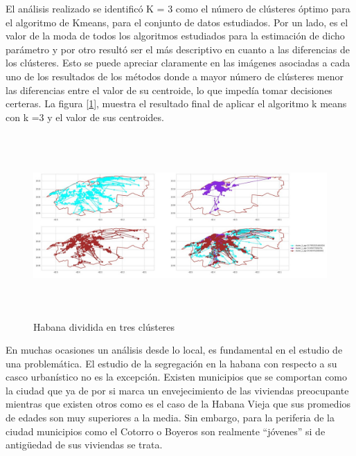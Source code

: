 El análisis realizado se identificó K = 3 como el número de clústeres óptimo para el algoritmo de Kmeans, para el conjunto de datos estudiados. Por un lado, es el valor de la moda de todos los algoritmos estudiados para la estimación de dicho parámetro y por otro resultó ser el más descriptivo en cuanto a las diferencias de los clústeres. Esto se puede apreciar claramente en las imágenes asociadas a cada uno de los resultados de los métodos donde a mayor número de clústeres menor las diferencias entre el valor de su centroide, lo que impedía tomar decisiones certeras. La figura [\ref{fig:Conc}], muestra el resultado final de aplicar el algoritmo k means con k =3 y el valor de sus centroides.

\begin{figure}[h!]
	\centering
	\includegraphics[width=15cm, height=7cm]{Images/Conclusion.jpg} 
	\caption{Habana dividida en tres clústeres}
	\label{fig:Conc}
\end{figure}

En muchas ocasiones un análisis desde lo local, es fundamental en el estudio de una problemática. El estudio de la segregación en la habana con respecto a su casco urbanístico no es la excepción. Existen municipios que se comportan como la ciudad que ya de por si marca un envejecimiento de las viviendas preocupante mientras que existen otros como es el caso de la Habana Vieja que sus promedios de edades son muy superiores a la media. Sin embargo, para la periferia de la ciudad municipios como el Cotorro o Boyeros son realmente “jóvenes” si de antigüedad de sus viviendas se trata.




